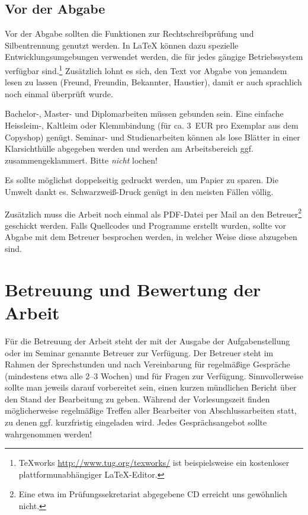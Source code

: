 \documentclass[
    12pt,
    headings=small,
    parskip=half,           %
    bibliography=totoc,
    numbers=noenddot,       %
    open=any,               %
    ]{scrreprt}
\begin{document}
\section{Vor der Abgabe}

Vor der Abgabe sollten die Funktionen zur Rechtschreibprüfung und Silbentrennung genutzt werden. In LaTeX können dazu spezielle Entwicklungsumgebungen verwendet werden, die für jedes gängige Betriebssystem verfügbar sind.\footnote{TeXworks \url{http://www.tug.org/texworks/} ist beispielsweise ein kostenloser plattformunabhängiger LaTeX-Editor.} Zusätzlich lohnt es sich, den Text vor Abgabe von jemandem lesen zu lassen (Freund, Freundin, Bekannter, Haustier), damit er auch sprachlich noch einmal überprüft wurde.

Bachelor-, Master- und Diplomarbeiten müssen gebunden sein. Eine einfache Heissleim-, Kaltleim oder Klemmbindung (für ca. 3~EUR pro Exemplar aus dem Copyshop) genügt. Seminar- und Studienarbeiten können als lose Blätter in einer Klarsichthülle abgegeben werden und werden am Arbeitsbereich ggf. zusammengeklammert. Bitte \emph{nicht} lochen!

Es sollte möglichst doppelseitig gedruckt werden, um Papier zu sparen. Die Umwelt dankt es. Schwarzweiß-Druck genügt in den meisten Fällen völlig.

Zusätzlich muss die Arbeit noch einmal als PDF-Datei per Mail an den Betreuer\footnote{Eine etwa im Prüfungssekretariat abgegebene CD erreicht uns gewöhnlich nicht.} geschickt werden. Falls Quellcodes und Programme erstellt wurden, sollte vor Abgabe mit dem Betreuer besprochen werden, in welcher Weise diese abzugeben sind.

\chapter{Betreuung und Bewertung der Arbeit}

Für die Betreuung der Arbeit steht der mit der Ausgabe der Aufgabenstellung oder im Seminar genannte Betreuer zur Verfügung. Der Betreuer steht im Rahmen der Sprechstunden und nach Vereinbarung für regelmäßige Gespräche (mindestens etwa alle 2--3 Wochen) und für Fragen zur Verfügung. Sinnvollerweise sollte man jeweils darauf vorbereitet sein, einen kurzen mündlichen Bericht über den Stand der Bearbeitung zu geben. Während der Vorlesungszeit finden möglicherweise regelmäßige Treffen aller Bearbeiter von Abschlussarbeiten statt, zu denen ggf. kurzfristig eingeladen wird. Jedes Gesprächsangebot sollte wahrgenommen werden!
\end{document}
